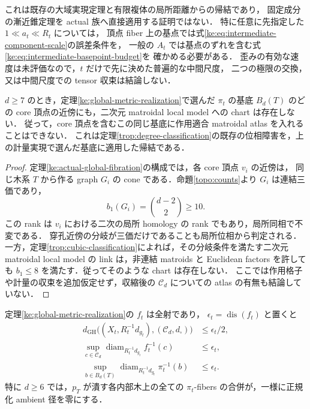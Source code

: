 これは既存の大域実現定理と有限複体の局所距離からの帰結であり，
固定成分の漸近錐定理を actual 族へ直接適用する証明ではない．
特に任意に先指定した $1\ll a_t\ll R_t$ については，
頂点 fiber 上の基点では式\eqref{ke:eq:intermediate-component-scale}の誤差条件を，
一般の $A_t$ では基点のずれを含む式\eqref{ke:eq:intermediate-basepoint-budget}を
確かめる必要がある．
歪みの有効な速度は未評価なので，$t$ だけで先に決めた普遍的な中間尺度，
二つの極限の交換，又は中間尺度での tensor 収束は結論しない．

\begin{corollary}
\label{ke:global-core-nonmatroidal}
$d\ge7$ のとき，定理\ref{ke:global-metric-realization}で選んだ $\pi_t$ の基底
$B_d(T)$ のどの core 頂点の近傍にも，二次元 matroidal local model への chart は存在しない．
従って，core 頂点を含むこの同じ基底に作用適合 matroidal atlas を入れることはできない．
これは定理\ref{trop:degree-classification}の既存の位相障害を，上の計量実現で選んだ基底に適用した帰結である．
\end{corollary}
\begin{proof}
定理\ref{ke:actual-global-fibration}の構成では，各 core 頂点 $v_i$ の近傍は，
同じ木系 $T$ から作る graph $G_i$ の cone である．命題\ref{topo:counts}より
$G_i$ は連結三価であり，
\[
 b_1(G_i)=\binom{d-2}{2}\ge10.
\]
この rank は $v_i$ における二次の局所 homology の rank でもあり，局所同相で不変である．
穿孔近傍の分岐が三価だけであることも局所位相から判定される．
一方，定理\ref{trop:cubic-classification}によれば，その分岐条件を満たす二次元
matroidal local model の link は，非連結 matroids と Euclidean factors を許しても
$b_1\le8$ を満たす．従ってそのような chart は存在しない．
ここでは作用格子や計量の収束を追加仮定せず，収縮後の $\mathcal C_d$ についての
atlas の有無も結論していない．
\end{proof}

\begin{corollary}
\label{ke:global-gh-and-fibers}
定理\ref{ke:global-metric-realization}の $f_t$ は全射であり，
$\epsilon_t=\operatorname{dis}(f_t)$ と置くと
\begin{align*}
 d_{\mathrm{GH}}\bigl((X_t,R_t^{-1}d_{g_t}),
                     (\mathcal C_d,d_\square)\bigr)&\le\epsilon_t/2,\\
 \sup_{c\in\mathcal C_d}
 \operatorname{diam}_{R_t^{-1}d_{g_t}}f_t^{-1}(c)&\le\epsilon_t,\\
 \sup_{b\in B_d(T)}
 \operatorname{diam}_{R_t^{-1}d_{g_t}}\pi_t^{-1}(b)&\le\epsilon_t.
\end{align*}
特に $d\ge6$ では，$p_T$ が潰す各内部木上の全ての
$\pi_t$-fibers の合併が，一様に正規化 ambient 径を零にする．
\end{corollary}

